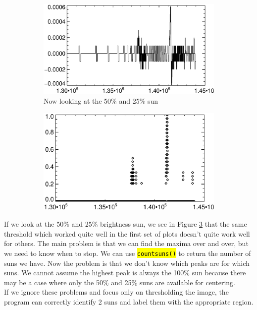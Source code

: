 \documentclass[10pt]{scrartcl}
\begin{document}
\begin{figure}[!h]
\begin{center}
   \begin{subfigure}[b]{.49\textwidth}
        \centering
        \includegraphics[width=1.\textwidth]{../plots_tables_images/reg23.eps}
        \caption{Now looking at the 50\% and 25\% sun}
        \label{reg23peaks}
    \end{subfigure}
    \begin{subfigure}[b]{.49\textwidth}
        \centering
        \includegraphics[width=1.\textwidth]{../plots_tables_images/scaledreg23.eps}
        \caption{}
        \label{scaled23peaks}
    \end{subfigure}
    \caption{}
    \end{center}
\end{figure}


If we look at the 50\% and 25\% brightness sun, we see in Figure \ref{scaled23peaks} that the same threshold which worked quite well in the first set of plots doesn't quite work well for others. The main problem is that we can find the maxima over and over, but we need to know when to stop. We can use \hl{\texttt{countsuns()}} to return the number of suns we have. Now the problem is that we don't know which peaks are for which suns. We cannot assume the highest peak is always the 100\% sun because there may be a case where only the 50\% and 25\% suns are available for centering. \\

If we ignore these problems and focus only on thresholding the image, the program can correctly identify 2 suns and label them with the appropriate region. 



\end{document}
